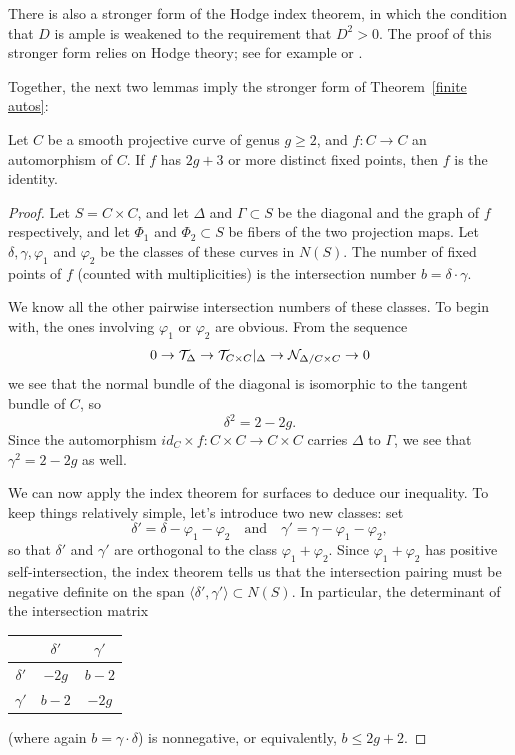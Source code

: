 There is also a stronger form of the Hodge index theorem, in which the
condition that $D$ is ample is weakened to the requirement that $D^2 >
0$. The proof of this stronger form relies on Hodge theory; see for
%
example \cite{MR1997577} or \cite{Griffiths-Harris1978}.

Together, the 
next
two lemmas imply the stronger form of
Theorem~\ref{finite autos}:

\begin{lemma}\label{2g+3fixedpoints}
Let $C$ be a smooth projective curve of genus $g \geq 2$, and $f: C \to C$
an automorphism of $C$.
 If $f$ has $2g+3$ or more distinct fixed points, then $f$ is the
 identity.
\end{lemma}

\begin{proof}
Let $S = C\times C$, and let $\Delta$ and $\Gamma \subset S$ be the
diagonal and the graph of $f$ respectively, and let $\Phi_1$ and
$\Phi_2 \subset S$ be fibers of the two projection maps. Let $\delta,
\gamma, \varphi_1$ and $\varphi_2$ be the classes of these curves in
$N(S)$. The number of fixed points of $f$ (counted with multiplicities)
is the intersection number  $b = \delta \cdot \gamma$.

We know all the other pairwise intersection numbers of these
classes. To begin with, the ones involving $\varphi_1$ or $\varphi_2$
are obvious. From the sequence
$$
0\to {\mathcal T}_{\Delta} \to {\mathcal T}_{C\times C}|_{\Delta} \to {\mathcal N}_{\Delta/C\times C}
\to 0
$$
we see that the normal bundle of the diagonal is isomorphic to the
tangent bundle of $C$, so
$$
\delta^2 = 2 - 2g.
$$
Since the automorphism $id_C \times f : C\times C \to C \times C$
carries $\Delta$ to $\Gamma$, we see that $\gamma^2 = 2-2g$ as well.

We can now apply the index theorem for surfaces to deduce our
inequality. To keep things relatively simple, let's introduce two new
classes: set
$$
\delta' = \delta - \varphi_1 - \varphi_2 \quad \text{and} \quad \gamma'
= \gamma - \varphi_1 - \varphi_2,
$$
so that $\delta'$ and $\gamma'$ are orthogonal to the class $\varphi_1 +
\varphi_2$. Since $\varphi_1 + \varphi_2$ has positive self-intersection,
the index theorem  tells us that the intersection pairing must be negative
definite on the span $\langle \delta',\gamma' \rangle \subset N(S)$. In
particular, the determinant of the intersection matrix
\begin{center}
\tabcolsep
\begin{tabular}{c|c@{\hskip\tabcolsep}c}
\downstrut
& $\delta'$ &  $\gamma'$  \\
\hline
\upstrut
$\delta'$ & $-2g$ & $b-2$ \\
$\gamma'$ & $b-2$ & $-2g$
\end{tabular}
\end{center}
(where again $b = \gamma \cdot \delta$) is nonnegative, or equivalently,
$b\leq 2g+2$.
\end{proof}

